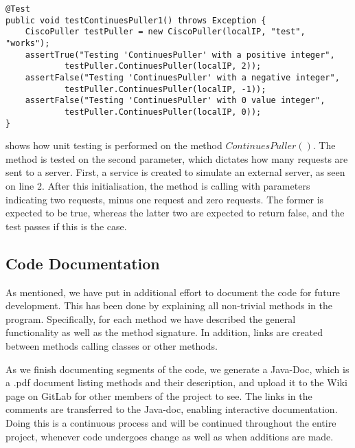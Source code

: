 \begin{lstlisting}[caption={Testing ContinuesPuller},label={lst:test_continuespuller},language=inc_Java, mathescape]
@Test
public void testContinuesPuller1() throws Exception {
    CiscoPuller testPuller = new CiscoPuller(localIP, "test", "works");
    assertTrue("Testing 'ContinuesPuller' with a positive integer",
            testPuller.ContinuesPuller(localIP, 2));
    assertFalse("Testing 'ContinuesPuller' with a negative integer",
            testPuller.ContinuesPuller(localIP, -1));
    assertFalse("Testing 'ContinuesPuller' with 0 value integer",
            testPuller.ContinuesPuller(localIP, 0));
}
\end{lstlisting}
 shows how unit testing is performed on the method $ContinuesPuller()$. The method is tested on the second parameter, which dictates how many requests are sent to a server. First, a service is created to simulate an external server, as seen on line 2. After this initialisation, the method is calling with parameters indicating two requests, minus one request and zero requests. The former is expected to be true, whereas the latter two are expected to return false, and the test passes if this is the case. 

\subsection{Code Documentation} \label{sec:code_documentation}
As mentioned, we have put in additional effort to document the code for future development. This has been done by explaining all non-trivial methods in the program. Specifically, for each method we have described the general functionality as well as the method signature. In addition, links are created between methods calling classes or other methods. 

As we finish documenting segments of the code, we generate a Java-Doc, which is a .pdf document listing methods and their description, and upload it to the Wiki page on GitLab for other members of the project to see. The links in the comments are transferred to the Java-doc, enabling interactive documentation. 
Doing this is a continuous process and will be continued throughout the entire project, whenever code undergoes change as well as when additions are made.

